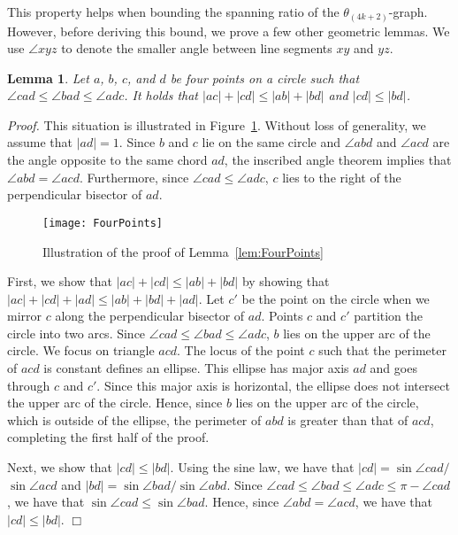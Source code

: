 \documentclass[12pt]{article}
\newtheorem{lem}[defin]{Lemma}
\newenvironment{lemma}{\begin{lem} \sl}{\end{lem}}
\newenvironment{proof}{\emph{Proof.}}{\hfill $\Box$\\}
\newcommand{\graph}[1]{\ensuremath{\theta_{(4 k + #1)}}-graph\xspace}
\begin{document}
This property helps when bounding the spanning ratio of the \graph{2}. However, before deriving this bound, we prove a few other geometric lemmas. We use $\angle xyz$ to denote the smaller angle between line segments $xy$ and $yz$. 

\begin{lemma}
  \label{lem:FourPoints}
  Let $a$, $b$, $c$, and $d$ be four points on a circle such that $\angle cad \leq \angle bad \leq \angle adc$. It holds that $|a c| + |c d| \leq |a b| + |b d|$ and $|c d| \leq |b d|$. 
\end{lemma}
\begin{proof}
  This situation is illustrated in Figure~\ref{fig:FourPoints}. Without loss of generality, we assume that $|a d| = 1$. Since $b$ and $c$ lie on the same circle and $\angle abd$ and $\angle acd$ are the angle opposite to the same chord $a d$, the inscribed angle theorem implies that $\angle abd = \angle acd$. Furthermore, since $\angle cad \leq \angle adc$, $c$ lies to the right of the perpendicular bisector of $a d$. 

  \begin{figure}
    \begin{center}
      \texttt{[image: FourPoints]}
    \end{center}
    \caption{Illustration of the proof of Lemma~\ref{lem:FourPoints}}
    \label{fig:FourPoints}
  \end{figure}

  First, we show that $|a c| + |c d| \leq |a b| + |b d|$ by showing that $|a c| + |c d| + |a d| \leq |a b| + |b d| + |a d|$. Let $c'$ be the point on the circle when we mirror $c$ along the perpendicular bisector of $a d$. Points $c$ and $c'$ partition the circle into two arcs. Since $\angle cad \leq \angle bad \leq \angle adc$, $b$ lies on the upper arc of the circle. We focus on triangle $a c d$. The locus of the point $c$ such that the perimeter of $a c d$ is constant defines an ellipse. This ellipse has major axis $a d$ and goes through $c$ and $c'$. Since this major axis is horizontal, the ellipse does not intersect the upper arc of the circle. Hence, since $b$ lies on the upper arc of the circle, which is outside of the ellipse, the perimeter of $a b d$ is greater than that of $a c d$, completing the first half of the proof. 

  Next, we show that $|c d| \leq |b d|$. Using the sine law, we have that $|c d| = \sin \angle cad /$ $\sin \angle acd$ and $|b d| = \sin \angle bad / \sin \angle abd$. Since $\angle cad \leq \angle bad \leq \angle adc \leq \pi - \angle cad$, we have that $\sin \angle cad \leq \sin \angle bad$. Hence, since $\angle abd = \angle acd$, we have that $|c d| \leq |b d|$. 
\end{proof}
\end{document}
